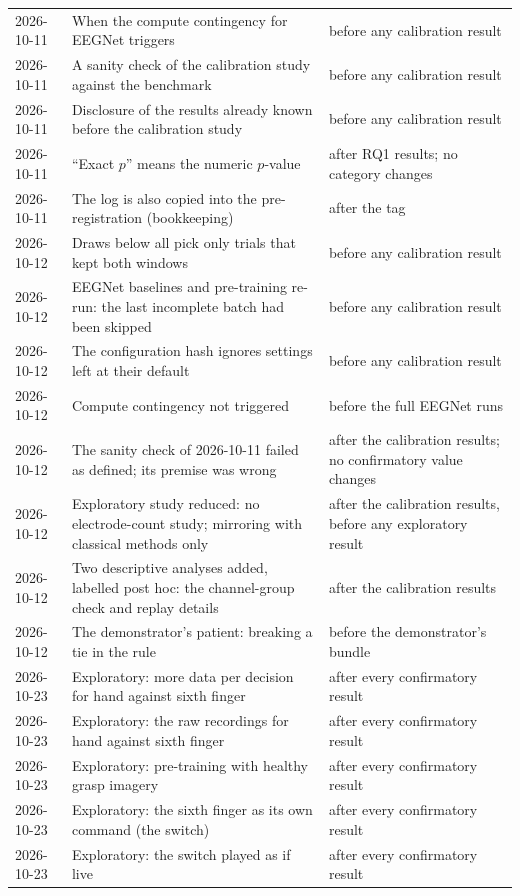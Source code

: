 \begin{center}
\begin{tabularx}{\textwidth}{@{}p{1.6cm}>{\raggedright\arraybackslash}X>{\raggedright\arraybackslash}p{4.6cm}@{}}
2026-10-11 & When the compute contingency for EEGNet triggers & before any calibration result \\
2026-10-11 & A sanity check of the calibration study against the benchmark & before any calibration result \\
2026-10-11 & Disclosure of the results already known before the calibration study & before any calibration result \\
2026-10-11 & ``Exact $p$'' means the numeric $p$-value & after RQ1 results; no category changes \\
2026-10-11 & The log is also copied into the pre-registration (bookkeeping) & after the tag \\
2026-10-12 & Draws below all pick only trials that kept both windows & before any calibration result \\
2026-10-12 & EEGNet baselines and pre-training re-run: the last incomplete batch had been skipped & before any calibration result \\
2026-10-12 & The configuration hash ignores settings left at their default & before any calibration result \\
2026-10-12 & Compute contingency not triggered & before the full EEGNet runs \\
2026-10-12 & The sanity check of 2026-10-11 failed as defined; its premise was wrong & after the calibration results; no confirmatory value changes \\
2026-10-12 & Exploratory study reduced: no electrode-count study; mirroring with classical methods only & after the calibration results, before any exploratory result \\
2026-10-12 & Two descriptive analyses added, labelled post hoc: the channel-group check and replay details & after the calibration results \\
2026-10-12 & The demonstrator's patient: breaking a tie in the rule & before the demonstrator's bundle \\
2026-10-23 & Exploratory: more data per decision for hand against sixth finger & after every confirmatory result \\
2026-10-23 & Exploratory: the raw recordings for hand against sixth finger & after every confirmatory result \\
2026-10-23 & Exploratory: pre-training with healthy grasp imagery & after every confirmatory result \\
2026-10-23 & Exploratory: the sixth finger as its own command (the switch) & after every confirmatory result \\
2026-10-23 & Exploratory: the switch played as if live & after every confirmatory result \\
\bottomrule
\end{tabularx}
\end{center}

